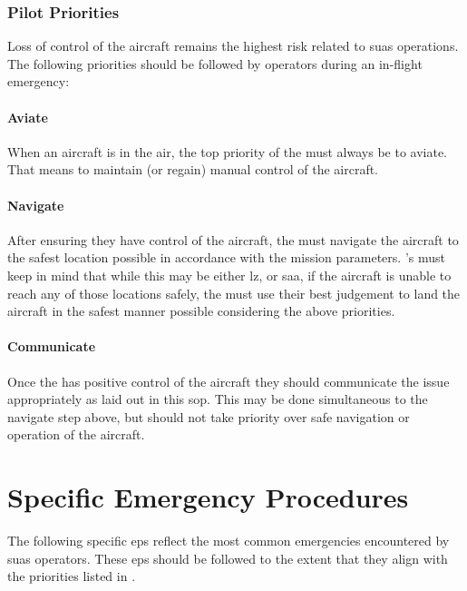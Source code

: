             \subsubsection{Pilot Priorities} Loss of control of the aircraft remains the highest risk related to \ac{suas} operations. The following priorities should be followed by operators during an in-flight emergency:
    
                    \paragraph{Aviate} When an aircraft is in the air, the top priority of the  must always be to aviate. That means to maintain (or regain) manual control of the aircraft.
    
                    \paragraph{Navigate} After ensuring they have control of the aircraft, the  must navigate the aircraft to the safest location possible in accordance with the mission parameters. 's must keep in mind that while this may be either \ac{lz}, or \ac{saa}, if the aircraft is unable to reach any of those locations safely, the  must use their best judgement to land the aircraft in the safest manner possible considering the above priorities.
    
                    \paragraph{Communicate}  Once the  has positive control of the aircraft they should communicate the issue appropriately as laid out in this \ac{sop}. This may be done simultaneous to the navigate step above, but should not take priority over safe navigation or operation of the aircraft.
                  
    \section{Specific Emergency Procedures}
        
        The following specific \ac{ep}s reflect the most common emergencies encountered by \ac{suas} operators. These \ac{ep}s should be followed to the extent that they align with the priorities listed in .

